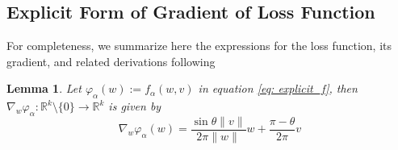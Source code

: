 \documentclass{amsart}%
\newtheorem{lemma}[theorem]{Lemma}
\begin{document}
\subsection{Explicit Form of Gradient of Loss Function}\label{ap:derivation_gls}
For completeness, we summarize here the expressions for the loss function, its gradient, and related derivations following 
\begin{lemma}
    Let $\varphi_{\alpha} ( w):=f_{\alpha}( w,  v)$ in equation \eqref{eq: explicit_f}, then $\nabla_{ w} \varphi_{\alpha}:\mathbb{R}^k \setminus\{0\}\to \mathbb{R}^k$ is given by
\begin{equation}
    \nabla_{ w} \varphi_{\alpha}( w)=\frac{\sin \theta\| v\|}{2\pi \| w\|}  w+
    \frac{\pi-\theta}{2\pi} v
\end{equation}
\end{lemma}
\end{document}
